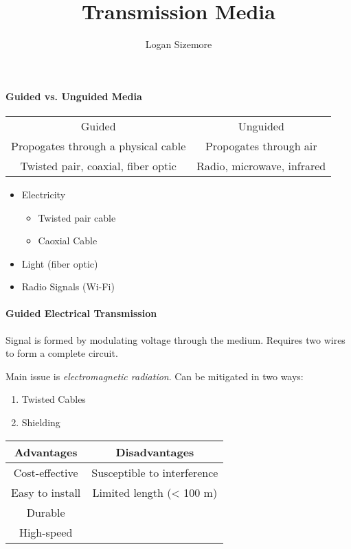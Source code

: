 \documentclass{article}
\title{Transmission Media}
\author{Logan Sizemore}
\begin{document}
\maketitle

\paragraph*{Guided vs. Unguided Media}
\begin{tabular}{cc}
    Guided                              & Unguided                   \\
    Propogates through a physical cable & Propogates through air     \\
    Twisted pair, coaxial, fiber optic  & Radio, microwave, infrared \\
\end{tabular}

\begin{itemize}
    \item Electricity \begin{itemize}
              \item Twisted pair cable
              \item Caoxial Cable
          \end{itemize}
    \item Light (fiber optic)
    \item Radio Signals (Wi-Fi)
\end{itemize}

\paragraph*{Guided Electrical Transmission}
Signal is formed by modulating voltage through the medium.
Requires two wires to form a complete circuit.

\begin{multicols}{2}
    Main issue is \emph{electromagnetic radiation}.
    Can be mitigated in two ways:
    \begin{enumerate}
        \item Twisted Cables
        \item Shielding
    \end{enumerate}
    \begin{tabular}{c|c}
        Advantages      & Disadvantages               \\ \hline
        Cost-effective  & Susceptible to interference \\
        Easy to install & Limited length (< 100 m)    \\
        Durable         &                             \\
        High-speed      &                             \\
    \end{tabular}
\end{multicols}
\end{document}
